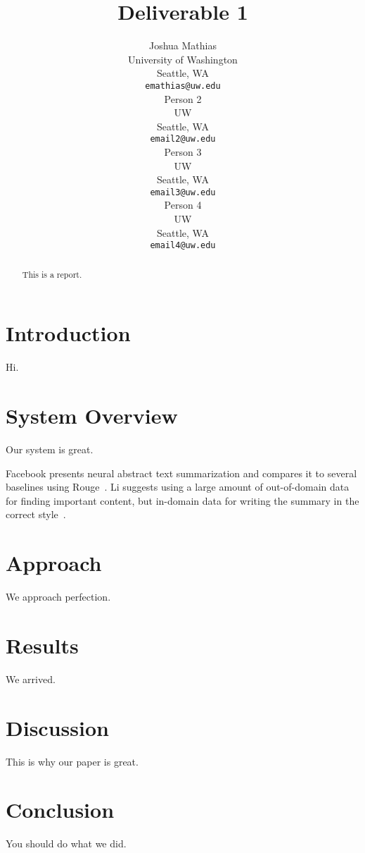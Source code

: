 \documentclass[11pt,a4paper]{article}
\title{Deliverable 1}
\author{Joshua Mathias \\
  University of Washington \\
  Seattle, WA \\
  {\tt emathias@uw.edu} 
  \\\And 
  Person 2 \\
  UW \\
  Seattle, WA \\
  {\tt email2@uw.edu} 
  \\\And 
  Person 3 \\
  UW \\
  Seattle, WA \\
  {\tt email3@uw.edu} 
  \\\And 
  Person 4 \\
  UW \\
  Seattle, WA \\
  {\tt email4@uw.edu} 
    }
\date{}
\begin{document}
\maketitle
\begin{abstract}
This is a report.
\end{abstract}

\section{Introduction}
Hi.

\section{System Overview}
Our system is great.

Facebook presents neural abstract text summarization and compares it to several baselines using Rouge~\cite{Rush:15}. Li suggests using a large amount of out-of-domain data for finding important content, but in-domain data for writing the summary in the correct style~.

\section{Approach}
We approach perfection.

\section{Results}
We arrived.

\section{Discussion}
This is why our paper is great.

\section{Conclusion}
You should do what we did.


\end{document}
